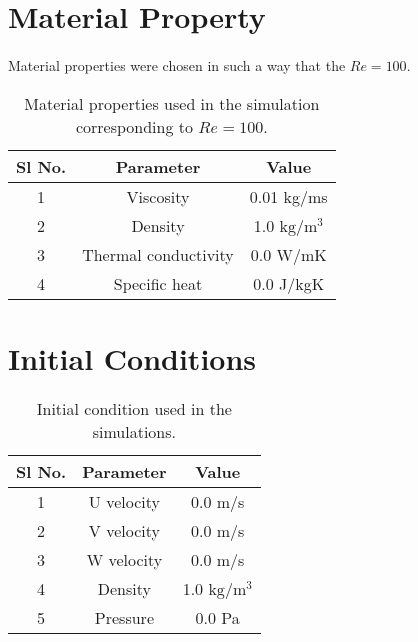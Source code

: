 \section*{Material Property}
     \paragraph*{}
          Material properties were chosen in such a way that the $Re = 100$.  
    \begin{table}[htb!]
	\centering
	\begin{tabular}[htb!]{||c|c|c||} \hline
		Sl No. &Parameter & Value \\ \hline
		1 & Viscosity & 0.01 kg/ms \\
		2 & Density & 1.0 $\text{kg}/\text{m}^3$ \\ 
		3 & Thermal conductivity & 0.0 W/mK \\ 
		4& Specific heat & 0.0 J/kgK \\ \hline
	\end{tabular}
\caption{Material properties used in the simulation corresponding to $Re = 100.$}
\label{tab:MaterialProperties_problemLDC}
\end{table}
\section*{Initial Conditions}
    \begin{table}[htb!]
	     \centering
	\begin{tabular}[htb!]{||c|c|c||} \hline
		Sl No. &Parameter & Value \\ \hline
		1 & U velocity & 0.0  m/s\\
		2 & V velocity & 0.0  m/s\\ 
		3 & W velocity & 0.0 m/s\\ 
		4& Density & 1.0 $\text{kg}/\text{m}^3$\\ 
		5 & Pressure & 0.0 Pa \\ \hline
		\end{tabular}
	\caption{Initial condition used in the simulations.}
	\label{tab: Initialcondition_problem LDC}
 \end{table}


